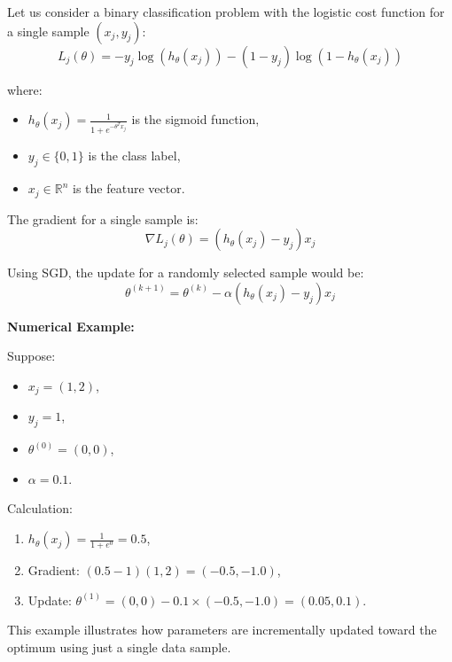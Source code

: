 \documentclass[12pt, letterpaper,conference]{IEEEtran}
\begin{document}
Let us consider a binary classification problem with the logistic cost function for a single sample \((x_j, y_j)\):
\[
L_j(\theta) = - y_j \log(h_\theta(x_j)) - (1 - y_j) \log(1 - h_\theta(x_j))
\]

where:
\begin{itemize}
    \item \( h_\theta(x_j) = \frac{1}{1 + e^{-\theta^T x_j}} \) is the sigmoid function,
    \item \( y_j \in \{0, 1\} \) is the class label,
    \item \( x_j \in \mathbb{R}^n \) is the feature vector.
\end{itemize}

The gradient for a single sample is:
\[
\nabla L_j(\theta) = (h_\theta(x_j) - y_j) x_j
\]

Using SGD, the update for a randomly selected sample would be:
\[
\theta^{(k+1)} = \theta^{(k)} - \alpha (h_\theta(x_j) - y_j) x_j
\]

\textbf{Numerical Example:}
\vspace{0.15cm}

Suppose:

\begin{itemize}
    \item \( x_j = (1, 2) \),
    \item \( y_j = 1 \),
    \item \( \theta^{(0)} = (0, 0) \),
    \item \( \alpha = 0.1 \).
\end{itemize}

\vspace{0.15cm}

Calculation:
\begin{enumerate}
    \item \( h_\theta(x_j) = \frac{1}{1 + e^{0}} = 0.5 \),
    \item Gradient: \( (0.5 - 1) (1, 2) = (-0.5, -1.0) \),
    \item Update: \( \theta^{(1)} = (0, 0) - 0.1 \times (-0.5, -1.0) = (0.05, 0.1) \).
\end{enumerate}

\vspace{0.15cm}

This example illustrates how parameters are incrementally updated toward the optimum using just a single data sample.



\vspace{0.25cm}
\end{document}
